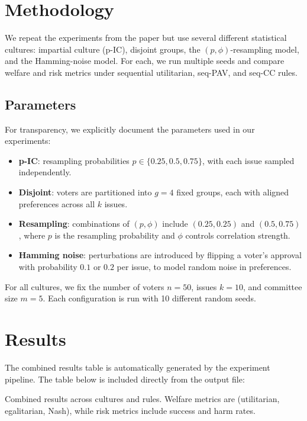 \documentclass[11pt]{article}
\begin{document}
\section{Methodology}
We repeat the experiments from the paper but use several different statistical
cultures: impartial culture (p-IC), disjoint groups, the $(p, \phi)$-resampling
model, and the Hamming-noise model. For each, we run multiple seeds and compare
welfare and risk metrics under sequential utilitarian, seq-PAV, and seq-CC rules.

\subsection{Parameters}
For transparency, we explicitly document the parameters used in our experiments:

\begin{itemize}
    \item \textbf{p-IC}: resampling probabilities 
    $p \in \{0.25, 0.5, 0.75\}$, with each issue sampled independently.
    \item \textbf{Disjoint}: voters are partitioned into $g = 4$ fixed groups, 
    each with aligned preferences across all $k$ issues.
    \item \textbf{Resampling}: combinations of $(p,\phi)$ include 
    $(0.25, 0.25)$ and $(0.5, 0.75)$, where $p$ is the resampling probability 
    and $\phi$ controls correlation strength.
    \item \textbf{Hamming noise}: perturbations are introduced by flipping a 
    voter’s approval with probability $0.1$ or $0.2$ per issue, to model 
    random noise in preferences.
\end{itemize}
For all cultures, we fix the number of voters $n=50$, issues $k=10$, and
committee size $m=5$. Each configuration is run with 10 different random seeds.

\section{Results}
The combined results table is automatically generated by the experiment
pipeline. The table below is included directly from the output file:

\begin{table}[h!]
\centering
\resizebox{\textwidth}{!}{%

}
\caption{Combined results across cultures and rules. Welfare metrics are
(utilitarian, egalitarian, Nash), while risk metrics include success and harm
rates.}
\label{tab:combined}
\end{table}
\end{document}
